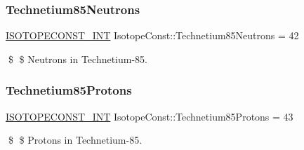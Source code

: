 \subsubsection{\texorpdfstring{Technetium85\+Neutrons}{Technetium85Neutrons}}
{\footnotesize\ttfamily \mbox{\hyperlink{group___isotope_const-_macros_ga5f18360b3e99483a35c32d789e62621c}{I\+S\+O\+T\+O\+P\+E\+C\+O\+N\+S\+T\+\_\+\+I\+NT}} Isotope\+Const\+::\+Technetium85\+Neutrons = 42}

\$ \$ Neutrons in Technetium-\/85. \mbox{\label{group___isotope_const-_technetium-_tc85_ga97fec6e2dc7e27e03b7b13a23d1974a0}} 
\subsubsection{\texorpdfstring{Technetium85\+Protons}{Technetium85Protons}}
{\footnotesize\ttfamily \mbox{\hyperlink{group___isotope_const-_macros_ga5f18360b3e99483a35c32d789e62621c}{I\+S\+O\+T\+O\+P\+E\+C\+O\+N\+S\+T\+\_\+\+I\+NT}} Isotope\+Const\+::\+Technetium85\+Protons = 43}

\$ \$ Protons in Technetium-\/85. 